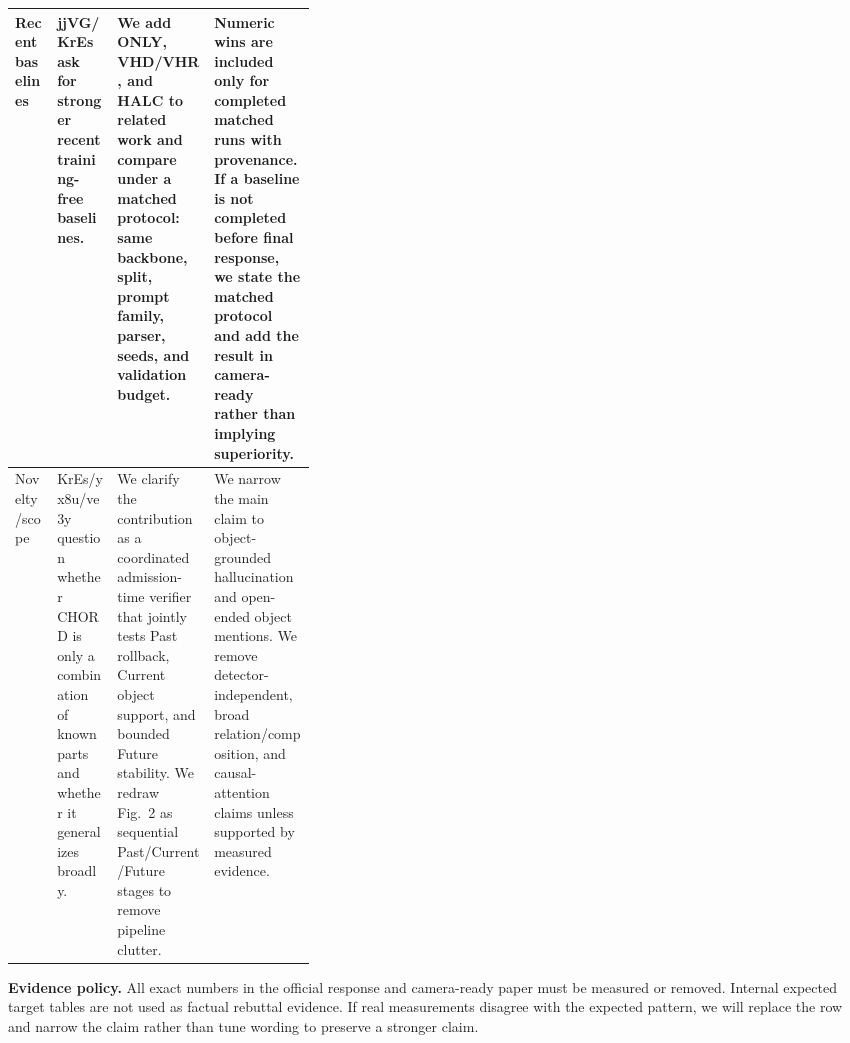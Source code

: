 \documentclass{article}
\begin{document}
\begin{tabularx}{\linewidth}{@{}p{0.145\linewidth}p{0.205\linewidth}Y Y@{}}
\midrule
Recent baselines & jjVG/KrEs ask for stronger recent training-free baselines. & We add ONLY, VHD/VHR, and HALC to related work and compare under a matched protocol: same backbone, split, prompt family, parser, seeds, and validation budget. & Numeric wins are included only for completed matched runs with provenance. If a baseline is not completed before final response, we state the matched protocol and add the result in camera-ready rather than implying superiority. \\
\midrule
Novelty/scope & KrEs/yx8u/ve3y question whether CHORD is only a combination of known parts and whether it generalizes broadly. & We clarify the contribution as a coordinated admission-time verifier that jointly tests Past rollback, Current object support, and bounded Future stability. We redraw Fig.~2 as sequential Past/Current/Future stages to remove pipeline clutter. & We narrow the main claim to object-grounded hallucination and open-ended object mentions. We remove detector-independent, broad relation/composition, and causal-attention claims unless supported by measured evidence. \\
\bottomrule
\end{tabularx}

\vspace{2pt}
\textbf{Evidence policy.} All exact numbers in the official response and camera-ready paper must be measured or removed. Internal expected target tables are not used as factual rebuttal evidence. If real measurements disagree with the expected pattern, we will replace the row and narrow the claim rather than tune wording to preserve a stronger claim.
\end{document}
